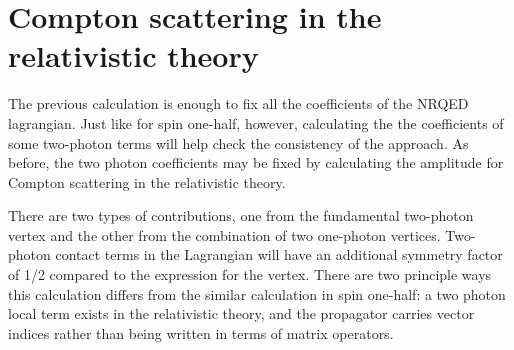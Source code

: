 \section{Compton scattering in the relativistic theory}


The previous calculation is enough to fix all the coefficients of the NRQED lagrangian.  Just like for spin one-half, however, calculating the the coefficients of some two-photon terms will help check the consistency of the approach.  As before, the two photon coefficients may be fixed by calculating the amplitude for Compton scattering in the relativistic theory.  

There are two types of contributions, one from the fundamental two-photon vertex and the other from the combination of two one-photon vertices.  Two-photon contact terms in the Lagrangian will have an additional symmetry factor of 1/2 compared to the expression for the vertex.  There are two principle ways this calculation differs from the similar calculation in spin one-half: a two photon local term exists in the relativistic theory, and the propagator carries vector indices rather than being written in terms of matrix operators.

